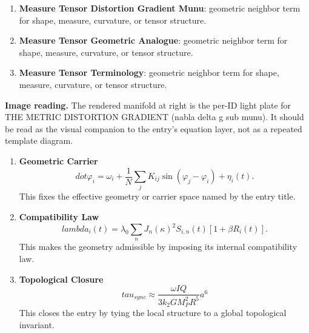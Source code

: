 \begin{enumerate}[leftmargin=1.6em,itemsep=6pt,topsep=4pt]
\item \textbf{Measure Tensor Distortion Gradient Munu}: geometric neighbor term for shape, measure, curvature, or tensor structure.
\item \textbf{Measure Tensor Geometric Analogue}: geometric neighbor term for shape, measure, curvature, or tensor structure.
\item \textbf{Measure Tensor Terminology}: geometric neighbor term for shape, measure, curvature, or tensor structure.
\end{enumerate}

\begin{samepage}
\noindent\begin{minipage}[t]{0.45\linewidth}
\vspace{0pt}
\raggedright
\scriptsize\textbf{Image reading.} The rendered manifold at right is the per-ID light plate for THE METRIC DISTORTION GRADIENT (nabla delta g sub munu). It should be read as the visual companion to the entry's equation layer, not as a repeated template diagram.\par
\end{minipage}\hfill
\begin{minipage}[t]{0.53\linewidth}
\vspace*{-0.10in}
\raggedright
{}
\end{minipage}
\end{samepage}

\clearpage


\begin{enumerate}[leftmargin=1.6em,itemsep=9pt,topsep=6pt]
\item \textbf{Geometric Carrier}
\[
dot\varphi_i = \omega_i + \frac{1}{N}\sum_j K_{ij}\sin(\varphi_j-\varphi_i) + \eta_i(t).
\]
This fixes the effective geometry or carrier space named by the entry title.

\item \textbf{Compatibility Law}
\[
lambda_i(t) = \lambda_0 \sum_n J_n(\kappa)^2 S_{i,n}(t) [1+\beta R_i(t)].
\]
This makes the geometry admissible by imposing its internal compatibility law.

\item \textbf{Topological Closure}
\[
tau_{sync} \approx \frac{\omega I Q}{3 k_2 G M_P^2 R^5} a^6
\]
This closes the entry by tying the local structure to a global topological invariant.
\end{enumerate}

